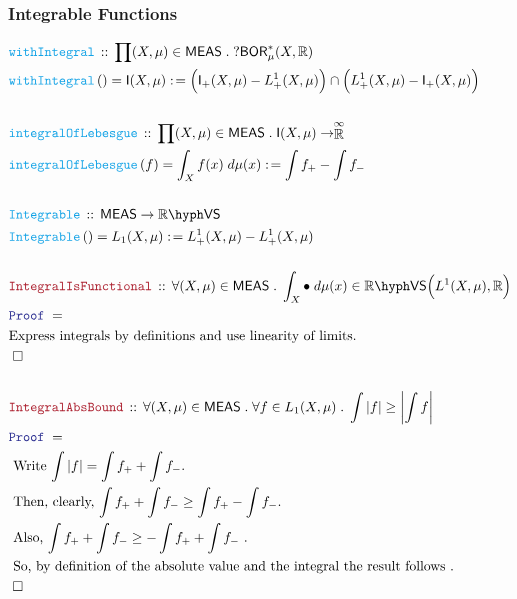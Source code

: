 \documentclass[12pt]{scrartcl}
\newcommand{\FUNC}[1]{\textcolor{Cerulean}{\mathtt{#1}}}
\newcommand{\LOGIC}[1]{\textcolor{Blue}{\mathtt{#1}}}
\newcommand{\THM}[1]{\textcolor{Maroon}{\mathtt{#1}}}
\renewcommand{\.}{\; . \;}
\newcommand{\de}{: \kern 0.1pc =}
\newcommand{\Act}[1]{\left( #1 \right)}
\newcommand{\Theorem}[2]{& \THM{#1} \, :: \, #2 \\ & \Proof = \\ }
\newcommand{\DeclareFunc}[2]{& \FUNC{#1} \, :: \, #2 \\}
\newcommand{\DefineNamedFunc}[4]{&  \FUNC{#1}\Act{#2} = #3 \de #4 \\}
\newcommand{\Page}[1]{ \begin{align*} #1 \end{align*}   }
\newcommand{\Reals}{\mathbb{R} }
\newcommand{\EReals}{\stackrel{\mathclap{\infty}}{\mathbb{R}}}
\newcommand{\QED}{\; \square}
\newcommand{\EndProof}{& \QED \\}
\newcommand{\Proof}{\LOGIC{Proof} \; }
\newcommand{\Explain}[1]{& \text{#1.} \\}
\newcommand{\BOR}{\mathsf{BOR}}
\newcommand{\VS}[1]{#1\hyph\mathsf{VS}} %
\newcommand{\Integrable}{\mathsf{I}}
\newcommand{\MEAS}{\mathsf{MEAS}}
\begin{document}
\subsubsection{Integrable Functions}
\Page{
	\DeclareFunc{withIntegral}{
		\prod (X,\mu) \in \MEAS \. ?\BOR_\mu^*(X,\Reals)}
	\DefineNamedFunc{withIntegral}{}{\Integrable(X,\mu)}
	{
		\Big(\Integrable_+(X,\mu) - L_{+}^1(X,\mu)\Big)
		\cap
		\Big( L_{+}^1(X,\mu) - \Integrable_+(X,\mu)\Big)
	}
	\\
	\DeclareFunc{integralOfLebesgue}{
		\prod (X,\mu) \in \MEAS \. \Integrable(X,\mu) \to \EReals}
	\DefineNamedFunc{integralOfLebesgue}{f}
	{\int_X f(x) \; d\mu(x)}
	{
		\int f_+ - \int f_-	
	}
	\\
	\DeclareFunc{Integrable}{
	 		\MEAS \to \VS{\Reals}
	}
	\DefineNamedFunc{Integrable}{}{L_1(X,\mu)}
	{
		L_{+}^1(X,\mu) - L_{+}^1(X,\mu)
	}
	\\
	\Theorem{IntegralIsFunctional}
	{
		\forall (X,\mu) \in \MEAS \.
		\int_X \bullet\; d\mu(x) \in \VS{\Reals}\Big( L^1(X,\mu), \Reals \Big)
	}
	\Explain{Express integrals by definitions and use linearity of limits}
	\EndProof
	\\
	\Theorem{IntegralAbsBound}
	{
		\forall (X,\mu) \in \MEAS \.
		\forall f \in L_1(X,\mu) \.
		\int |f| \ge \left| \int f \right|
	}
	\Explain{
		Write $\int |f| = \int f_+ + \int f_-$}
	\Explain{
		Then,  clearly, $\int f_+ + \int f_- \ge \int f_+ - \int f_-$}
	\Explain{
		Also, $\int f_+ + \int f_- \ge -\int f_+ + \int f_-$
	}
	\Explain{
		So, by definition of the absolute value and the integral the result follows
	}
	\EndProof
}
\newpage
\end{document}
